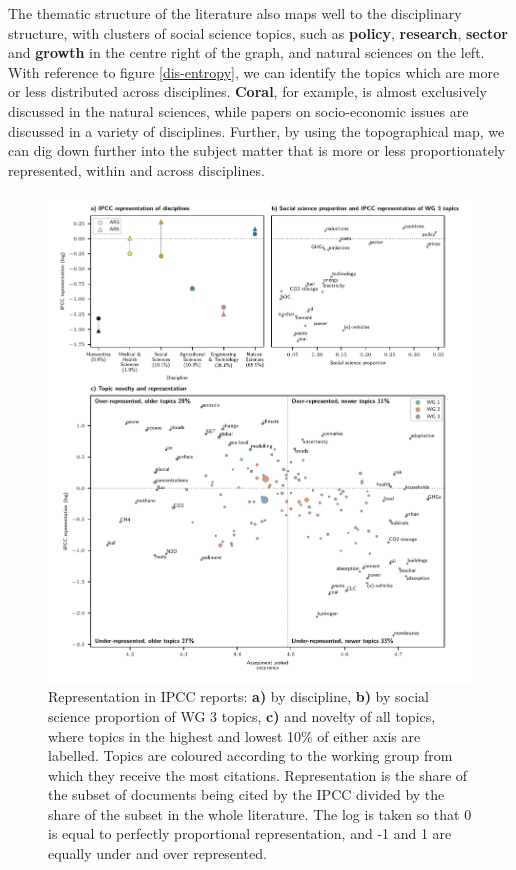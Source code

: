\documentclass{article}
\begin{document}
\begin{linenumbers}
The thematic structure of the literature also maps well to the disciplinary structure, with clusters of social science topics, such as \textbf{policy}, \textbf{research}, \textbf{sector} and \textbf{growth} in the centre right of the graph, and natural sciences on the left. With reference to figure \ref{dis-entropy}, we can identify the topics which are more or less distributed across disciplines. \textbf{Coral}, for example, is almost exclusively discussed in the natural sciences, while papers on socio-economic issues are discussed in a variety of disciplines. Further, by using the topographical map, we can dig down further into the subject matter that is more or less proportionately represented, within and across disciplines.






\begin{figure}[htp]
	\begin{center}
		\includegraphics[width=180mm]{plots_pub/big_panel_representation.pdf}
		\caption{Representation in IPCC reports: \textbf{a)} by discipline, \textbf{b)} by social science proportion of WG 3 topics, \textbf{c)} and novelty of all topics, where topics in the highest and lowest 10\% of either axis are labelled. Topics are coloured according to the working group from which they receive the most citations. Representation is the share of the subset of documents being cited by the IPCC divided by the share of the subset in the whole literature. The log is taken so that 0 is equal to perfectly proportional representation, and -1 and 1 are equally under and over represented.}
		\label{oecd_rep}
	\end{center}
\end{figure}


\end{linenumbers}
\end{document}
